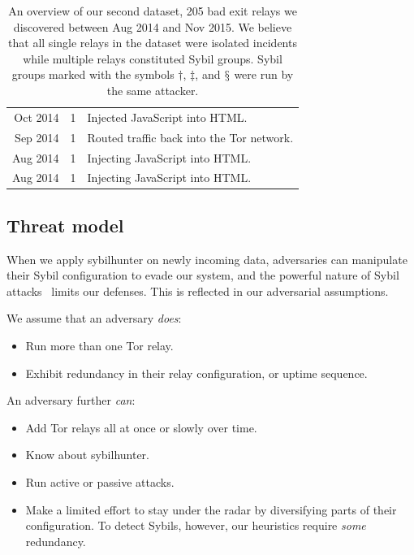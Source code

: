 \begin{table}[t]
\begin{tabular}{r c p{4cm}}
Oct 2014 & 1 & Injected JavaScript into HTML. \\
Sep 2014 & 1 & Routed traffic back into the Tor network. \\
Aug 2014 & 1 & Injecting JavaScript into HTML. \\
Aug 2014 & 1 & Injecting JavaScript into HTML. \\
\end{tabular}
\caption{An overview of our second dataset, 205 bad exit relays we discovered
	between Aug 2014 and Nov 2015.  We believe that all single relays in
	the dataset were isolated incidents while multiple relays constituted Sybil
	groups.  Sybil groups marked with the symbols $\dagger$, $\ddagger$, and
	$\mathsection$ were run by the same attacker.}
\label{tab:exitmap-dataset}
\end{table}

\subsection{Threat model}
\label{sec:threat_model}
When we apply sybilhunter on newly incoming data, adversaries can manipulate
their Sybil configuration to evade our system, and the powerful nature of Sybil
attacks~\cite{Douceur2002a} limits our defenses.  This is reflected in our
adversarial assumptions.

We assume that an adversary \emph{does}:
\begin{itemize}
	\item Run more than one Tor relay.

	\item Exhibit redundancy in their relay configuration, or uptime sequence.
\end{itemize}

An adversary further \emph{can}:
\begin{itemize}
	\item Add Tor relays all at once or slowly over time.

	\item Know about sybilhunter.

	\item Run active or passive attacks.

	\item Make a limited effort to stay under the radar by diversifying parts of
		their configuration.  To detect Sybils, however, our heuristics require
		\emph{some} redundancy.
\end{itemize}

